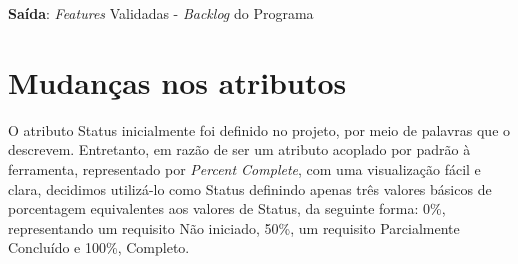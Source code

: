 \textbf{Saída}:  \textit{Features} Validadas - \textit{Backlog} do Programa  \\


\section{Mudanças nos atributos}

O atributo Status inicialmente foi definido no projeto, por meio de palavras que o descrevem.
Entretanto, em razão de ser um atributo acoplado por padrão à ferramenta, representado por \textit{Percent Complete},
com uma visualização fácil e clara, decidimos utilizá-lo como Status definindo apenas três valores básicos de porcentagem 
equivalentes aos valores de Status, da seguinte forma: 0\%, representando um requisito Não iniciado, 50\%, um requisito Parcialmente 
Concluído e 100\%, Completo.
